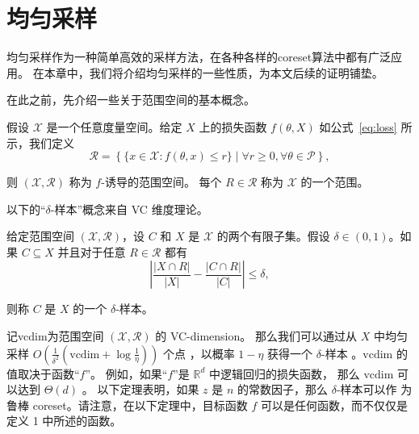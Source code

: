 \chapter{均匀采样}

均匀采样作为一种简单高效的采样方法，在各种各样的coreset算法中都有广泛应用。
在本章中，我们将介绍均匀采样的一些性质，为本文后续的证明铺垫。

在此之前，先介绍一些关于范围空间的基本概念。

\begin{definition}[f-诱导的范围空间]
    假设 $\mathcal{X}$ 是一个任意度量空间。给定 $X$ 上的损失函数 $f(\theta, X)$ 如公式~\eqref{eq:loss} 所示，我们定义
    \begin{equation}
    \mathcal{R} = \left\{ \{ x \in \mathcal{X} : f(\theta, x) \leq r \} \mid \forall r \geq 0, \forall \theta \in \mathcal{P} \right\},
    \end{equation}

则 $(\mathcal{X}, \mathcal{R})$ 称为 $f$-诱导的范围空间。
每个 $R \in \mathcal{R}$ 称为 $\mathcal{X}$ 的一个范围。

\end{definition}

以下的“$\delta$-样本”概念来自 VC 维度理论。

给定范围空间 $(\mathcal{X}, \mathcal{R})$，设 $C$ 和 $X$ 是 $\mathcal{X}$ 的两个有限子集。假设 $\delta \in (0, 1)$。如果 $C \subseteq X$ 并且对于任意 $R \in \mathcal{R}$ 都有
\begin{equation}
\left| \frac{|X \cap R|}{|X|} - \frac{|C \cap R|}{|C|} \right| \leq \delta,
\end{equation}

则称 $C$ 是 $X$ 的一个 $\delta$-样本。

记vcdim为范围空间 $(\mathcal{X}, \mathcal{R})$ 的 VC-dimension。
那么我们可以通过从 $X$ 中均匀采样 $O\left(\frac{1}{\delta^2} \left(\text{vcdim} + \log \frac{1}{\eta}\right)\right)$ 个点
，以概率 $1 - \eta$ 获得一个 $\delta$-样本 \citep{LLS01}。$\text{vcdim}$ 的值取决于函数“$f$”。
例如，如果“$f$”是 $\mathbb{R}^d$ 中逻辑回归的损失函数，
那么 $\text{vcdim}$ 可以达到 $\Theta(d)$ \citep{MSSW18}。
以下定理表明，如果 $z$ 是 $n$ 的常数因子，那么 $\delta$-样本可以作
为鲁棒 coreset。请注意，在以下定理中，目标函数 $f$ 可以是任何函数，而不仅仅是定义 1 中所述的函数。